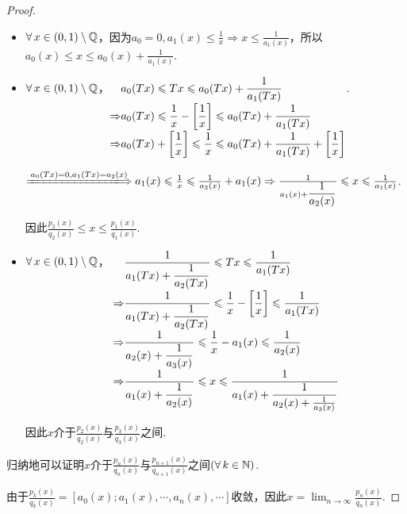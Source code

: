 \begin{proof}
    \begin{itemize}
        \item $\forall\, x\in (0,1)\setminus\mathbb{Q}$，因为$a_0=0,a_1(x)\leq\frac{1}{x}\Rightarrow x\leq\frac{1}{a_1(x)}$，所以$a_0(x)\leq x\leq a_0(x)+\frac{1}{a_1(x)}$.
        \item $\forall\, x\in(0,1)\setminus\mathbb{Q}$，$\setjot\begin{aligned}[t]
            &a_0(Tx) \leq Tx\leq a_0(Tx)+\frac{1}{a_1(Tx)} \\
            \Rightarrow& a_0(Tx)\leq\frac{1}{x}-\left[\frac{1}{x}\right]\leq a_0(Tx)+\frac{1}{a_1(Tx)} \\
            \Rightarrow& a_0(Tx)+\left[\frac{1}{x}\right]\leq\frac{1}{x}\leq a_0(Tx)+\frac{1}{a_1(Tx)}+\left[\frac{1}{x}\right]
        \end{aligned}$.\par
        $\xLongrightarrow{a_0(Tx)=0,a_1(Tx)=a_2(x)}a_1(x)\leq\frac{1}{x}\leq\frac{1}{a_2(x)}+a_1(x)\Rightarrow \frac{1}{a_1(x)+\dfrac{1}{a_2(x)}}\leq x\leq \frac{1}{a_1(x)}$.\par
        因此$\frac{p_2(x)}{q_2(x)}\leq x\leq \frac{p_1(x)}{q_1(x)}$.
        \item $\forall\, x\in(0,1)\setminus\mathbb{Q}$， $\setjot\begin{aligned}[t]&\frac{1}{a_1(Tx)+\dfrac{1}{a_2(Tx)}}\leq Tx\leq\frac{1}{a_1(Tx)} \\
        \Rightarrow& \frac{1}{a_1(Tx)+\dfrac{1}{a_2(Tx)}}\leq \frac{1}{x}-\left[\frac{1}{x}\right]\leq \frac{1}{a_1(Tx)} \\
        \Rightarrow& \frac{1}{a_2(x)+\dfrac{1}{a_3(x)}}\leq\frac{1}{x}-a_1(x)\leq\frac{1}{a_2(x)} \\
        \Rightarrow& \frac{1}{a_1(x)+\dfrac{1}{a_2(x)}}\leq x\leq \frac{1}{a_1(x)+\dfrac{1}{a_2(x)+\frac{1}{a_3(x)}}}
        \end{aligned}$\par
        因此$x$介于$\frac{p_2(x)}{q_2(x)}$与$\frac{p_3(x)}{q_3(x)}$之间.
    \end{itemize}\par
    归纳地可以证明$x$介于$\frac{p_n(x)}{q_n(x)}$与$\frac{p_{n+1}(x)}{q_{n+1}(x)}$之间$(\forall\, k\in\mathbb{N})$.\par
    由于$\frac{p_k(x)}{q_k(x)}=[a_0(x);a_1(x),\cdots,a_n(x),\cdots]$收敛，因此$x=\lim_{n\to\infty}\frac{p_n(x)}{q_n(x)}$.
\end{proof}

